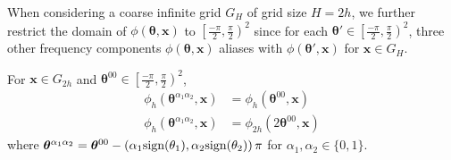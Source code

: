 \documentclass[12pt]{article}
\begin{document}
When considering a coarse infinite grid $G_H$ of grid size $H = 2h$, we further restrict the domain of $\phi(\boldsymbol{\theta}, \mathbf{x})$ to $\left[\frac{-\pi}{2}, \frac{\pi}{2}\right)^2$ since for each $\boldsymbol{\theta}' \in \left[\frac{-\pi}{2}, \frac{\pi}{2}\right)^2$, three other frequency components $\phi(\boldsymbol{\theta}, \mathbf{x})$ aliases with $\phi(\boldsymbol{\theta}', \mathbf{x})$ for  $ \mathbf{x} \in G_H$. 
\begin{lemma} \label{th:aliasing}
    For $\mathbf{x} \in G_{2h}$ and $\boldsymbol{\theta}^{00} \in \left[\frac{-\pi}{2}, \frac{\pi}{2}\right)^2$,
    \begin{align*}
        \phi_h(\boldsymbol{\theta}^{\alpha_1\alpha_2}, \mathbf{x}) &= \phi_h(\boldsymbol{\theta}^{00}, \mathbf{x}) \\
        \phi_{h}(\boldsymbol{\theta}^{\alpha_1\alpha_2}, \mathbf{x}) &= \phi_{2h}(2\boldsymbol{\theta}^{00}, \mathbf{x})
    \end{align*}
    where $\boldsymbol{\theta}^{\alpha_1\alpha_2} = \boldsymbol{\theta}^{00} - \left(\alpha_1 \text{sign} (\theta_1), \alpha_2 \text{sign} (\theta_2)\right)\pi$ for $\alpha_1, \alpha_2 \in \{0, 1\}$. 
\end{lemma}
\end{document}

